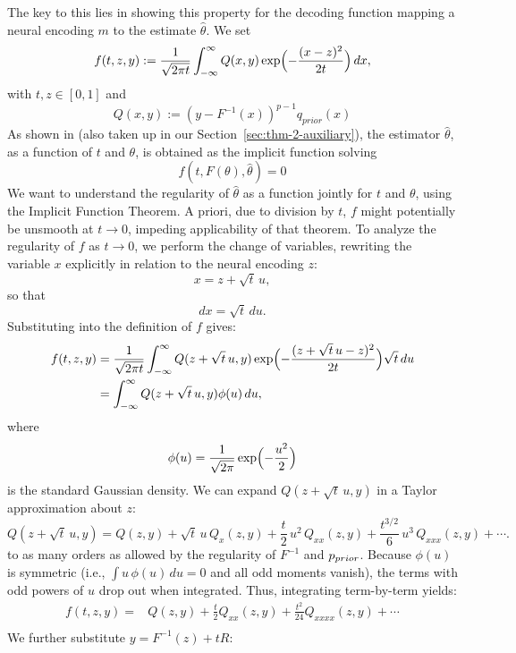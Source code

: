 The key to this lies in showing this property for the decoding function mapping a neural encoding $m$ to the estimate $\widehat{\theta}$.
We set
\[
f(t,z,y) := \frac{1}{\sqrt{2\pi t}} \int_{-\infty}^{\infty} Q(x,y) \exp\Bigl(-\frac{(x-z)^2}{2t}\Bigr) \, dx,
\]
with \(t,z \in [0,1]\) and
\begin{equation}
    Q(x,y) := (y-F^{-1}(x))^{p-1} q_{prior}(x)
\end{equation}
As shown in \citet[][SI Appendix, Proof of Theorem 1]{hahn2024unifying} (also taken up in our Section~\ref{sec:thm-2-auxiliary}), the estimator $\widehat{\theta}$, as a function of $t$ and $\theta$, is obtained as the implicit function solving
\begin{equation}
    f(t,F(\theta), \widehat{\theta}) = 0
\end{equation}
We want to understand the regularity of $\widehat{\theta}$ as a function jointly for $t$ and $\theta$, using the Implicit Function Theorem.
A priori, due to division by $t$, $f$ might potentially be unsmooth at $t\rightarrow 0$, impeding applicability of that theorem.
To analyze the regularity of \(f\) as \(t \to 0\), we perform the change of variables, rewriting the variable $x$ explicitly in relation to the neural encoding $z$:
\[
x = z + \sqrt{t}\, u,
\]
so that
\[
dx = \sqrt{t}\, du.
\]
Substituting into the definition of \(f\) gives:
\[
\begin{aligned}
f(t,z,y) &= \frac{1}{\sqrt{2\pi t}} \int_{-\infty}^{\infty} Q(z+\sqrt{t}\, u,y) \exp\Bigl(-\frac{(z+\sqrt{t}\, u - z)^2}{2t}\Bigr) \sqrt{t}\, du \\
&= \int_{-\infty}^{\infty} Q(z+\sqrt{t}\, u,y) \phi(u)\, du,
\end{aligned}
\]
where
\[
\phi(u)=\frac{1}{\sqrt{2\pi}}\exp\Bigl(-\frac{u^2}{2}\Bigr)
\]
is the standard Gaussian density.
We can expand \(Q(z+\sqrt{t}\, u,y)\) in a Taylor approximation about \(z\):
\[
Q(z+\sqrt{t}\, u,y) = Q(z,y) + \sqrt{t}\, u\, Q_x(z,y) + \frac{t}{2}\, u^2\, Q_{xx}(z,y) + \frac{t^{3/2}}{6}\, u^3\, Q_{xxx}(z,y) + \cdots.
\]
to as many orders as allowed by the regularity of $F^{-1}$ and $p_{prior}$.
Because \(\phi(u)\) is symmetric (i.e., \(\int u\,\phi(u) \,du=0\) and all odd moments vanish), the terms with odd powers of \(u\) drop out when integrated. Thus, integrating term-by-term yields:
\begin{align*}
f(t,z,y)=& Q(z,y) + \frac{t}{2} Q_{xx}(z,y) + \frac{t^2}{24} Q_{xxxx}(z,y)+\cdots \\
\end{align*}
We further substitute $y = F^{-1}(z) + t R$:

